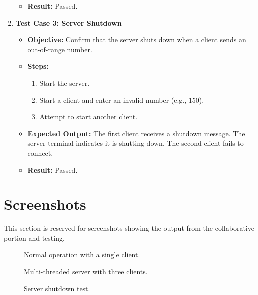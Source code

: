 \documentclass{article}
\begin{document}
\begin{enumerate}
\begin{itemize}
        \item \textbf{Result:} Passed.
    \end{itemize}
    \item \textbf{Test Case 3: Server Shutdown}
    \begin{itemize}
        \item \textbf{Objective:} Confirm that the server shuts down when a client sends an out-of-range number.
        \item \textbf{Steps:}
            \begin{enumerate}
                \item Start the server.
                \item Start a client and enter an invalid number (e.g., 150).
                \item Attempt to start another client.
            \end{enumerate}
        \item \textbf{Expected Output:} The first client receives a shutdown message. The server terminal indicates it is shutting down. The second client fails to connect.
        \item \textbf{Result:} Passed.
    \end{itemize}
\end{enumerate}

\section{Screenshots}

This section is reserved for screenshots showing the output from the collaborative portion and testing.

\begin{figure}[H]
    \centering
    \caption{Normal operation with a single client.}
\end{figure}

\begin{figure}[H]
    \centering
    \caption{Multi-threaded server with three clients.}
\end{figure}

\begin{figure}[H]
    \centering
    \caption{Server shutdown test.}
\end{figure}
\end{document}
